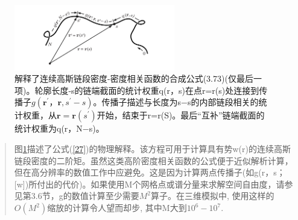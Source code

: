 \begin{figure}[h]
	\centering
	\includegraphics[width=7cm]{33.png}
	\caption{解释了连续高斯链段密度-密度相关函数的合成公式(3.73)(仅最后一项)。轮廓长度-s的链端截面的统计权重q(r，s)在点r=r(s)处连接到传播子$g(\mathbf{r}^{'}，\mathbf{r},s^{'}−s)$。传播子描述与长度为s−s的内部链段相关的统计权重，从$\mathbf{r}=\mathbf{r}(s^{'})$开始，结束于r=r(S)。最后“互补”链端截面的统计权重为q(r，N−s)。}
	\label{figure2}
\end{figure}
\begin{quotation}
	图\ref{figure2}描述了公式(\ref{27})的物理解释。该方程可用于计算具有势w(r)的连续高斯链段密度的二阶矩。虽然这类高阶密度相关函数的公式便于近似解析计算，但在高分辨率的数值工作中应避免。这是因为计算两点传播子(如g(r，s；[w])所付出的代价)。如果使用M个网格点或谱分量来求解空间自由度，请参见第3.6节，g的数值计算至少需要$M^2$算子。在三维模拟中, 使用这样的$O(M^2)$缩放的计算令人望而却步, 其中M大到$10^6-10^7$.
\end{quotation}
